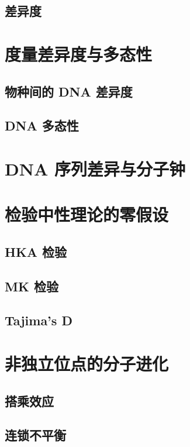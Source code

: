 \documentclass[12pt]{article}
\begin{document}
\subsection{差异度}

\section{度量差异度与多态性}

\subsection{物种间的 DNA 差异度}

\subsection{DNA 多态性}

\section{DNA 序列差异与分子钟}

\section{检验中性理论的零假设}

\subsection{HKA 检验}

\subsection{MK 检验}

\subsection{Tajima’s D}

\section{非独立位点的分子进化}

\subsection{搭乘效应}

\subsection{连锁不平衡}
\end{document}
